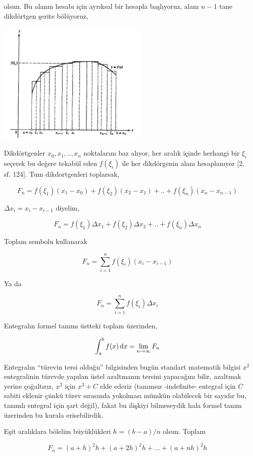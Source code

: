 \documentclass[12pt,fleqn]{article}\usepackage{../../common}
\begin{document}
olsun. Bu alanın hesabı için ayrıksal bir hesapla başlıyoruz, alanı $n-1$ tane
dikdörtgen şerite bölüyoruz,

\includegraphics[width=20em]{ode_mattuck_65_diffint1_04.jpg}

Dikdörtgenler $x_0,x_1,..,x_n$ noktalarını baz alıyor, her aralık içinde
herhangi bir $\xi_i$ seçerek bu değere tekabül eden $f(\xi_i)$ ile her
dikdörgenin alanı hesaplanıyor [2, sf. 124]. Tum dikdortgenleri toplarsak,

$$
F_n = f(\xi_1)(x_1 - x_0) + f(\xi_2)(x_2 - x_1) + .. + f(\xi_n)(x_n - x_{n-1})
$$

$\Delta x_i = x_i - x_{i-1}$ diyelim, 

$$
F_n = f(\xi_1)\Delta x_1 + f(\xi_2)\Delta x_2 + .. + f(\xi_n)\Delta x_n
$$

Toplam sembolu kullanarak

$$
F_n = \sum _{i=1}^{n} f(\xi_i) (x_i - x_{i-1}) 
$$

Ya da

$$
F_n = \sum _{i=1}^{n} f(\xi_i) \Delta x_i
$$

Entegralın formel tanımı üstteki toplam üzerinden,

$$
\int _{a}^{b} f(x) \,\mathrm{d} x = \lim_{n \to \infty} F_n
$$

Entegralın ``türevin tersi olduğu'' bilgisinden bugün standart matematik bilgisi
$x^2$ entegralinin türevde yapılan üstel azaltmanın tersini yapacağını bilir,
azaltmak yerine çoğaltırız, $x^2$ için $x^3 + C$ elde ederiz (tanımsız
-indefinite- entegral için $C$ sabiti eklenir çünkü türev sırasında yokolması
mümkün olabilecek bir sayıdır bu, tanımlı entegral için şart değil), fakat
bu ilişkiyi bilmeseydik hala formel tanım üzerinden bu kurala erisebilirdik. 

Eşit aralıklara bölelim büyüklükleri $h = (b-a)/n$ olsun. Toplam

$$
F_n = (a+h)^2 h + (a+2h)^2 h + ... + (a+nh)^2 h
$$
\end{document}
